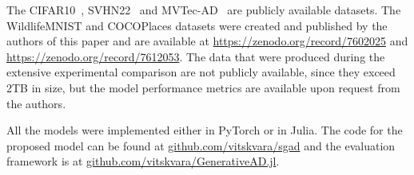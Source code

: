 The CIFAR10~\cite{krizhevsky2009learning}, SVHN22~\cite{netzer2011reading} and MVTec-AD~\cite{bergmann2019mvtec} are publicly available datasets. The WildlifeMNIST and COCOPlaces datasets were created and published by the authors of this paper and are available at \url{https://zenodo.org/record/7602025} and \url{https://zenodo.org/record/7612053}. The data that were produced during the extensive experimental comparison are not publicly available, since they exceed 2TB in size, but the model performance metrics are available upon request from the authors.


All the models were implemented either in PyTorch or in Julia. The code for the proposed model can be found at \url{github.com/vitskvara/sgad} and the evaluation framework is at \url{github.com/vitskvara/GenerativeAD.jl}. 

